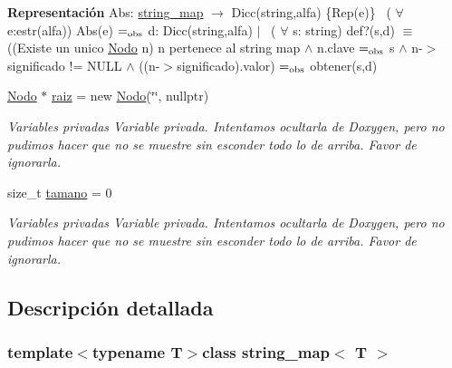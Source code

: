 \begin{Indent}{\bf Representación}
{Abs\+: \hyperlink{classstring__map}{string\+\_\+map} $\to$ Dicc(string,alfa) \{Rep(e)\}~\newline
 ( $\forall$ e\+:estr(alfa)) Abs(e) $=_{\rm obs}$ d\+: Dicc(string,alfa) $\vert$~\newline
 ( $\forall$ s\+: string) def?(s,d) $\equiv$ ((Existe un unico \hyperlink{structstring__map_1_1Nodo}{Nodo} n) n pertenece al string map $\land$ n.\+clave $=_{\rm obs}$ s $\land$ n-\/$>$significado != N\+U\+L\+L $\land$ ((n-\/$>$significado).valor) $=_{\rm obs}$ obtener(s,d) }\begin{DoxyCompactItemize}
\item 
\hypertarget{classstring__map_a26da8481a5a55413d82244e98ba3b923}{\hyperlink{structstring__map_1_1Nodo}{Nodo} $\ast$ \hyperlink{classstring__map_a26da8481a5a55413d82244e98ba3b923}{raiz} = new \hyperlink{structstring__map_1_1Nodo}{Nodo}(\char`\"{}\char`\"{}, nullptr)}\label{classstring__map_a26da8481a5a55413d82244e98ba3b923}

\begin{DoxyCompactList}\small\item\em Variables privadas Variable privada. Intentamos ocultarla de Doxygen, pero no pudimos hacer que no se muestre sin esconder todo lo de arriba. Favor de ignorarla. \end{DoxyCompactList}\item 
\hypertarget{classstring__map_aa6d1368586c5ab95f1ad0fc39723bf72}{size\+\_\+t \hyperlink{classstring__map_aa6d1368586c5ab95f1ad0fc39723bf72}{tamano} = 0}\label{classstring__map_aa6d1368586c5ab95f1ad0fc39723bf72}

\begin{DoxyCompactList}\small\item\em Variables privadas Variable privada. Intentamos ocultarla de Doxygen, pero no pudimos hacer que no se muestre sin esconder todo lo de arriba. Favor de ignorarla. \end{DoxyCompactList}\end{DoxyCompactItemize}
\end{Indent}


\subsection{Descripción detallada}
\subsubsection*{template$<$typename T$>$class string\+\_\+map$<$ T $>$}

